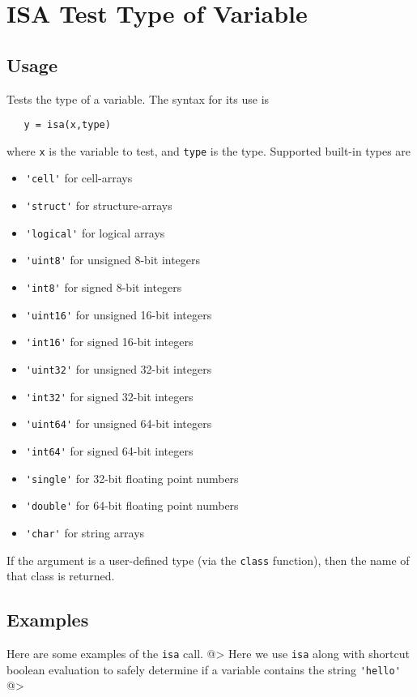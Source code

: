 \section{ISA Test Type of Variable}

\subsection{Usage}

Tests the type of a variable.  The syntax for its
use is
\begin{verbatim}
   y = isa(x,type)
\end{verbatim}
where \verb|x| is the variable to test, and \verb|type| is
the type.  Supported built-in types are
\begin{itemize}
\item  \verb|'cell'| for cell-arrays

\item  \verb|'struct'| for structure-arrays

\item  \verb|'logical'| for logical arrays

\item  \verb|'uint8'| for unsigned 8-bit integers

\item  \verb|'int8'| for signed 8-bit integers

\item  \verb|'uint16'| for unsigned 16-bit integers

\item  \verb|'int16'| for signed 16-bit integers

\item  \verb|'uint32'| for unsigned 32-bit integers

\item  \verb|'int32'| for signed 32-bit integers

\item  \verb|'uint64'| for unsigned 64-bit integers

\item  \verb|'int64'| for signed 64-bit integers

\item  \verb|'single'| for 32-bit floating point numbers

\item  \verb|'double'| for 64-bit floating point numbers

\item  \verb|'char'| for string arrays

\end{itemize}
If the argument is a user-defined type (via the \verb|class| function), then
the name of that class is returned.
\subsection{Examples}

Here are some examples of the \verb|isa| call.
@>
Here we use \verb|isa| along with shortcut boolean evaluation to 
safely determine if a variable contains the string \verb|'hello'|
@>
